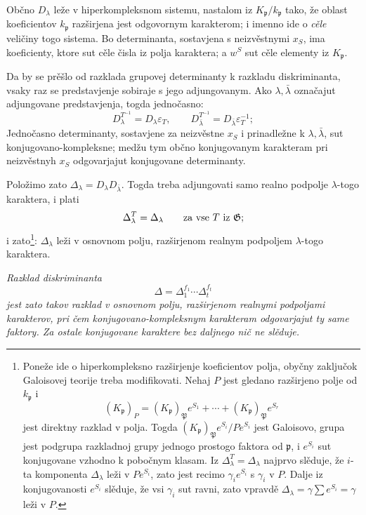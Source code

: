 \documentclass[11pt]{article}
\providecommand{\frakp}{\mathfrak{p}}
\providecommand{\Gg}{\mathfrak{G}}
\begin{document}
Občno \(D_\lambda\) leže v hiperkompleksnom sistemu, nastalom iz \(K_\frakp/k_\frakp\) tako, že oblast koeficientov \(k_\frakp\) razširjena jest odgovornym karakterom; i imenno ide o \emph{cěle} veličiny togo sistema. Bo determinanta, sostavjena s neizvěstnymi \(x_S\), ima koeficienty, ktore sut cěle čisla iz polja karaktera; a \(w^S\) sut cěle elementy iz \(K_\frakp\).

Da by se prěšlo od razklada grupovej determinanty k razkladu diskriminanta, vsaky raz se predstavjenje sobiraje s jego adjungovanym. Ako \(\lambda,\bar\lambda\) označajut adjungovane predstavjenja, togda jednočasno:
\[
        D_\lambda^{T^{-1}}=D_\lambda\varepsilon_T,
        \qquad
        D_{\bar\lambda}^{T^{-1}}=D_{\bar\lambda}\varepsilon_T^{-1};
\]
Jednočasno determinanty, sostavjene za neizvěstne \(x_S\) i prinadležne k \(\lambda,\bar\lambda\), sut konjugovano-kompleksne; medžu tym občno konjugovanym karakteram pri neizvěstnyh \(x_S\) odgovarjajut konjugovane determinanty.

Položimo zato \(\Delta_\lambda=D_\lambda D_{\bar\lambda}\). Togda treba adjungovati samo realno podpolje \(\lambda\)-togo karaktera, i plati
\[
        \Delta_\lambda^T=\Delta_\lambda
        \qquad\hbox{za vse }T\hbox{ iz }\Gg;
\]
i zato\footnote{Poneže ide o hiperkompleksno razširjenje koeficientov polja, obyčny zaključok Galoisovej teorije treba modifikovati. Nehaj \(P\) jest gledano razširjeno polje od \(k_\frakp\) i
\[
        (K_\frakp)_P=(K_\frakp)_\mathfrak P e^{S_1}+\cdots+(K_\frakp)_\mathfrak P e^{S_r}
\]
jest direktny razklad v polja. Togda \((K_\frakp)_\mathfrak P e^{S_i}/Pe^{S_i}\) jest Galoisovo, grupa jest podgrupa razkladnoj grupy jednogo prostogo faktora od \(\frakp\), i \(e^{S_i}\) sut konjugovane vzhodno k pobočnym klasam. Iz \(\Delta_\lambda^T=\Delta_\lambda\) najprvo slěduje, že \(i\)-ta komponenta \(\Delta_\lambda\) leži v \(Pe^{S_i}\), zato jest recimo \(\gamma_i e^{S_i}\) s \(\gamma_i\) v \(P\). Dalje iz konjugovanosti \(e^{S_i}\) slěduje, že vsi \(\gamma_i\) sut ravni, zato vpravdě \(\Delta_\lambda=\gamma\sum e^{S_i}=\gamma\) leži v \(P\).}: \(\Delta_\lambda\) leži v osnovnom polju, razširjenom realnym podpoljem \(\lambda\)-togo karaktera.

\emph{Razklad diskriminanta}
\[
        \Delta=\Delta_1^{f_1}\cdots\Delta_t^{f_t}
\]
\emph{jest zato takov razklad v osnovnom polju, razširjenom realnymi podpoljami karakterov, pri čem konjugovano-kompleksnym karakteram odgovarjajut ty same faktory. Za ostale konjugovane karaktere bez daljnego nič ne slěduje.}
\end{document}
